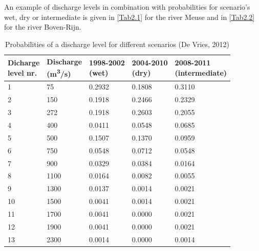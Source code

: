 An example of discharge levels in combination with probabilities for scenario's wet, dry or intermediate is given in \autoref{Tab2.1} for the river Meuse and in \autoref{Tab2.2} for the river Boven-Rijn.

\begin{table}[h]
\center
\begin{tabular}{p{2cm}p{2cm}p{2cm}p{2cm}p{2.5cm}}
\makecell[l]{Dicharge\\level nr.} & \makecell[l]{Discharge\\(m\textsuperscript{3}/s)} &\makecell[l]{1998-2002\\(wet)} & \makecell[l]{2004-2010\\(dry)} & \makecell[l]{2008-2011\\(intermediate)} \\ \hline
1 & 75 & 0.2932 & 0.1808 & 0.3110 \\
2 & 150 & 0.1918 & 0.2466 & 0.2329 \\
3 & 272 & 0.1918 & 0.2603 & 0.2055 \\
4 & 400 & 0.0411 & 0.0548 & 0.0685 \\
5 & 500 & 0.1507 & 0.1370 & 0.0959 \\
6 & 750 & 0.0548 & 0.0712 & 0.0548 \\
7 & 900 & 0.0329 & 0.0384 & 0.0164 \\
8 & 1100 & 0.0164 & 0.0082 & 0.0055 \\
9 & 1300 & 0.0137 & 0.0014 & 0.0021 \\
10 & 1500 & 0.0041 & 0.0014 & 0.0021 \\
11 & 1700 & 0.0041 & 0.0000 & 0.0021 \\
12 & 1900 & 0.0041 & 0.0000 & 0.0021 \\
13 & 2300 & 0.0014 & 0.0000 & 0.0014 \\ \hline
\end{tabular}
\caption{Probabilities of a discharge level for different scenarios (De Vries, 2012)}
\label{Tab2.1}
\end{table}

